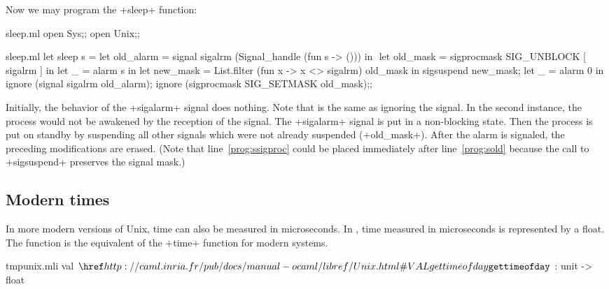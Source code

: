 \begin{example} Now we may program the \ml+sleep+ function:
%
\begin{codefile}{sleep.ml}
open Sys;;
open Unix;;
\end{codefile}
%
\begin{listingcodefile}[style=numbers]{sleep.ml}
let sleep s = 
  let old_alarm = signal sigalrm (Signal_handle (fun s -> ())) in $\label{prog:sold}$
  let old_mask = sigprocmask SIG_UNBLOCK [ sigalrm ] in
  let _ = alarm s in
  let new_mask = List.filter (fun x -> x <> sigalrm) old_mask in
  sigsuspend new_mask; 
  let _ = alarm 0 in
  ignore (signal sigalrm old_alarm); 
  ignore (sigprocmask SIG_SETMASK old_mask)$\label{prog:ssigproc}$;;
\end{listingcodefile}
%
Initially, the behavior of the \ml+sigalarm+ signal does nothing.  Note
that  is the same as ignoring the signal.  In
the second instance, the process would not be awakened by the reception
of the signal. The \ml+sigalarm+ signal is put in a non-blocking
state.  Then the process is put on standby by suspending all other
signals which were not already suspended (\ml+old_mask+). After the alarm
is signaled, the preceding modifications are erased. (Note that
line~\ref{prog:ssigproc} could be placed immediately after
line~\ref{prog:sold} because the call to \ml+sigsuspend+ preserves
the signal mask.)

\end{example}

\subsection*{Modern times}

In more modern versions of Unix, time can also be measured in microseconds.
In {\ocaml}, time measured in microseconds is represented by a float.  
The  function is the equivalent of the \ml+time+ 
function for modern systems.

%
\begin{listingcodefile}{tmpunix.mli}
val $\libvalue{Unix}{gettimeofday}$ : unit -> float
\end{listingcodefile}

